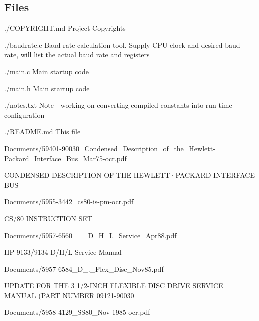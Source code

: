\subsection*{Files}


\begin{DoxyItemize}
\item ./\+C\+O\+P\+Y\+R\+I\+G\+HT.md Project Copyrights
\item ./baudrate.c Baud rate calculation tool. Supply C\+PU clock and desired baud rate, will list the actual baud rate and registers
\item ./main.c Main startup code
\item ./main.h Main startup code
\item ./notes.txt Note -\/ working on converting compiled constants into run time configuration
\item ./\+R\+E\+A\+D\+ME.md This file
\item Documents/59401-\/90030\+\_\+\+Condensed\+\_\+\+Description\+\_\+of\+\_\+the\+\_\+\+Hewlett-\/\+Packard\+\_\+\+Interface\+\_\+\+Bus\+\_\+\+Mar75-\/ocr.\+pdf
\begin{DoxyItemize}
\item C\+O\+N\+D\+E\+N\+S\+ED D\+E\+S\+C\+R\+I\+P\+T\+I\+ON OF T\+HE H\+E\+W\+L\+E\+T\+T·\+P\+A\+C\+K\+A\+RD I\+N\+T\+E\+R\+F\+A\+CE B\+US
\end{DoxyItemize}
\item Documents/5955-\/3442\+\_\+cs80-\/is-\/pm-\/ocr.\+pdf
\begin{DoxyItemize}
\item C\+S/80 I\+N\+S\+T\+R\+U\+C\+T\+I\+ON S\+ET
\end{DoxyItemize}
\item Documents/5957-\/6560\+\_\+\_\+\_\+\+D\+\_\+\+H\+\_\+\+L\+\_\+\+Service\+\_\+\+Apr88.\+pdf
\begin{DoxyItemize}
\item HP 9133/9134 D/\+H/L Service Manual
\end{DoxyItemize}
\item Documents/5957-\/6584\+\_\+D\+\_.\+\_\+\+Flex\+\_\+\+Disc\+\_\+\+Nov85.\+pdf
\begin{DoxyItemize}
\item U\+P\+D\+A\+TE F\+OR T\+HE 3 1/2-\/\+I\+N\+CH F\+L\+E\+X\+I\+B\+LE D\+I\+SC D\+R\+I\+VE S\+E\+R\+V\+I\+CE M\+A\+N\+U\+AL (P\+A\+RT N\+U\+M\+B\+ER 09121-\/90030
\end{DoxyItemize}
\item Documents/5958-\/4129\+\_\+\+S\+S80\+\_\+\+Nov-\/1985-\/ocr.\+pdf

\end{DoxyItemize}
